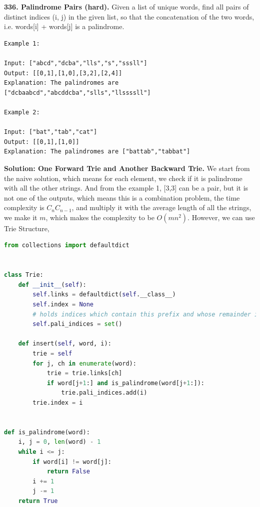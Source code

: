 \documentclass[data-structure.tex]{subfiles}
\begin{document}
\begin{examples}
\item \textbf{336. Palindrome Pairs (hard).} Given a list of unique words, find all pairs of distinct indices (i, j) in the given list, so that the concatenation of the two words, i.e. words[i] + words[j] is a palindrome.
\begin{lstlisting}
Example 1:

Input: ["abcd","dcba","lls","s","sssll"]
Output: [[0,1],[1,0],[3,2],[2,4]] 
Explanation: The palindromes are ["dcbaabcd","abcddcba","slls","llssssll"]

Example 2:

Input: ["bat","tab","cat"]
Output: [[0,1],[1,0]] 
Explanation: The palindromes are ["battab","tabbat"]
\end{lstlisting}
\textbf{Solution: One Forward Trie and Another Backward Trie.}  We start from the naive solution, which means for each element, we check if it is palindrome with all the other strings. And from the example 1, [3,3] can be a pair, but it is not one of the outputs, which means this is a combination problem, the time complexity is ${C_n}{C_{n-1}}$, and multiply it with the average length of all the strings, we make it $m$, which makes the complexity to be $O(mn^2)$. However, we can use Trie Structure, 
\begin{lstlisting}[language = Python]
from collections import defaultdict


class Trie:
    def __init__(self):
        self.links = defaultdict(self.__class__)
        self.index = None
        # holds indices which contain this prefix and whose remainder is a palindrome
        self.pali_indices = set()

    def insert(self, word, i):
        trie = self
        for j, ch in enumerate(word):
            trie = trie.links[ch]
            if word[j+1:] and is_palindrome(word[j+1:]):
                trie.pali_indices.add(i)
        trie.index = i


def is_palindrome(word):
    i, j = 0, len(word) - 1
    while i <= j:
        if word[i] != word[j]:
            return False
        i += 1
        j -= 1
    return True



\end{lstlisting}
\end{examples}
\end{document}
